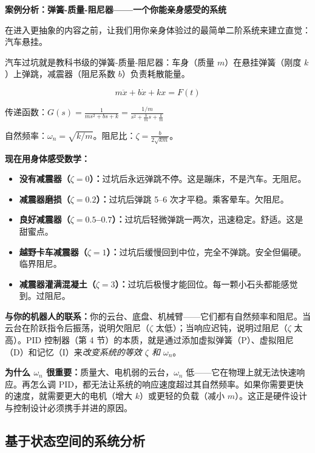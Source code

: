 \vspace{0.5em}
\begin{mdframed}[linewidth=1pt, innertopmargin=10pt, innerbottommargin=10pt]
\textbf{案例分析：弹簧-质量-阻尼器——一个你能亲身感受的系统}

\vspace{0.3em}
在进入更抽象的内容之前，让我们用你亲身体验过的最简单二阶系统来建立直觉：汽车悬挂。

汽车过坑就是教科书级的弹簧-质量-阻尼器：车身（质量 $m$）在悬挂弹簧（刚度 $k$）上弹跳，减震器（阻尼系数 $b$）负责耗散能量。

\[
m\ddot{x} + b\dot{x} + kx = F(t)
\]

传递函数：$G(s) = \frac{1}{ms^2 + bs + k} = \frac{1/m}{s^2 + \frac{b}{m}s + \frac{k}{m}}$

自然频率：$\omega_n = \sqrt{k/m}$。\quad 阻尼比：$\zeta = \frac{b}{2\sqrt{km}}$。

\textbf{现在用身体感受数学：}
\begin{itemize}[nosep]
    \item \textbf{没有减震器（$\zeta = 0$）：}过坑后永远弹跳不停。这是蹦床，不是汽车。无阻尼。
    \item \textbf{减震器磨损（$\zeta = 0.2$）：}过坑后弹跳 5--6 次才平稳。乘客晕车。欠阻尼。
    \item \textbf{良好减震器（$\zeta = 0.5$--$0.7$）：}过坑后轻微弹跳一两次，迅速稳定。舒适。这是甜蜜点。
    \item \textbf{越野卡车减震器（$\zeta = 1$）：}过坑后缓慢回到中位，完全不弹跳。安全但偏硬。临界阻尼。
    \item \textbf{减震器灌满混凝土（$\zeta = 3$）：}过坑后极慢才能回位。每一颗小石头都能感觉到。过阻尼。
\end{itemize}

\textbf{与你的机器人的联系：}你的云台、底盘、机械臂——它们都有自然频率和阻尼。当云台在阶跃指令后振荡，说明欠阻尼（$\zeta$ 太低）；当响应迟钝，说明过阻尼（$\zeta$ 太高）。PID 控制器（第 4 节）的本质，就是通过添加虚拟弹簧（P）、虚拟阻尼（D）和记忆（I）来\textit{改变系统的等效 $\zeta$ 和 $\omega_n$}。

\textbf{为什么 $\omega_n$ 很重要：}质量大、电机弱的云台，$\omega_n$ 低——它在物理上就无法快速响应。再怎么调 PID，都无法让系统的响应速度超过其自然频率。如果你需要更快的速度，就需要更大的电机（增大 $k$）或更轻的负载（减小 $m$）。这正是硬件设计与控制设计必须携手并进的原因。
\end{mdframed}

\subsection{基于状态空间的系统分析}

